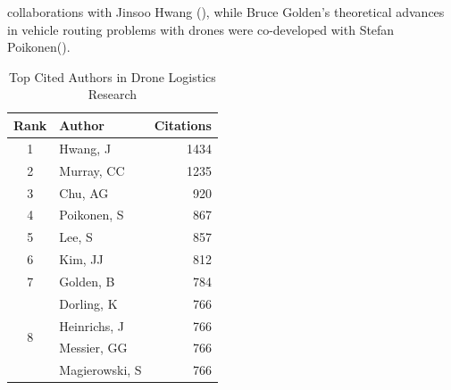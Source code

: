 \documentclass{article}
\begin{document}
collaborations with Jinsoo Hwang (\cite{WOS:000514800800001, WOS:000605628800016, WOS:000623397300001}), while Bruce Golden’s theoretical advances in vehicle routing problems with drones were co-developed with Stefan Poikonen(\cite{WOS:000400384200003, WOS:000468604000010}).

\begin{table}[htbp]
  \centering
  \caption{Top Cited Authors in Drone Logistics Research}
  \label{tab:ranked_authors}
  \begin{tabular}{@{} c l r @{}} %
    \toprule
    \textbf{Rank} & \textbf{Author} & \textbf{Citations} \\
    \midrule
    1 & Hwang, J & 1434 \\
    2 & Murray, CC & 1235 \\
    3 & Chu, AG & 920 \\
    4 & Poikonen, S & 867 \\
    5 & Lee, S & 857 \\
    6 & Kim, JJ & 812 \\
    7 & Golden, B & 784 \\
    \multirow{4}{*}{8} & Dorling, K & 766 \\ %
                        & Heinrichs, J & 766 \\
                        & Messier, GG & 766 \\
                        & Magierowski, S & 766 \\
    \bottomrule
  \end{tabular}
\end{table}

\FloatBarrier %
\end{document}
